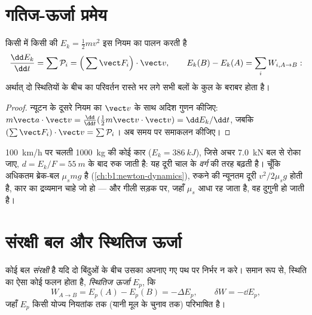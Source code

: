 \section{गतिज-ऊर्जा प्रमेय}

\begin{theorem}[गतिज-ऊर्जा और शक्ति प्रमेय]\label{thm:b1:work-and-energy:ke}
किसी  में किसी  की \emph{}
$E_k = \tfrac12 mv^2$ इस नियम का पालन करती है
\[
\frac{\dd E_k}{\dd t} = \sum\mathcal P_i = \Big(\sum\vect F_i\Big)\cdot\vect v,
\qquad
E_k(B) - E_k(A) = \sum_i W_{i,A\to B}:
\]
अर्थात् दो स्थितियों के बीच  का परिवर्तन रास्ते भर लगे सभी बलों
के कुल  के बराबर होता है।
\end{theorem}

\begin{proof}
न्यूटन के दूसरे नियम का $\vect v$ के साथ अदिश गुणन कीजिए: $m\vect a\cdot\vect v =
\tfrac{\dd}{\dd t}(\tfrac12 m\vect v\cdot\vect v) = \dd E_k/\dd t$, जबकि
$(\sum\vect F_i)\cdot\vect v = \sum\mathcal P_i$। अब समय पर समाकलन कीजिए।
\end{proof}

\begin{example}[ब्रेक-दूरी]\label{ex:b1:work-and-energy:braking}
\qty{100}{km/h} पर चलती \qty{1000}{kg} की कोई कार ($E_k = \qty{386}{kJ}$),
जिसे अचर \qty{7.0}{kN} बल से रोका जाए, $d = E_k/F = \qty{55}{m}$ के बाद
रुक जाती है: यह दूरी चाल के \emph{वर्ग} की तरह बढ़ती है। चूँकि अधिकतम
ब्रेक-बल $\mu_smg$ है (\cref{ch:b1:newton-dynamics}), रुकने की न्यूनतम दूरी
$v^2/2\mu_sg$ होती है, कार का द्रव्यमान चाहे जो हो --- और गीली सड़क पर,
जहाँ $\mu_s$ आधा रह जाता है, वह दुगुनी हो जाती है।
\end{example}

\section{संरक्षी बल और स्थितिज ऊर्जा}

\begin{definition}[संरक्षी बल; स्थितिज ऊर्जा]\label{def:b1:work-and-energy:conservative}
कोई बल \emph{संरक्षी} है यदि दो बिंदुओं के बीच उसका  अपनाए गए पथ पर
निर्भर न करे। समान रूप से, स्थिति का ऐसा कोई फलन होता है, \emph{स्थितिज
ऊर्जा} $E_p$, कि
\[
W_{A\to B} = E_p(A) - E_p(B) = -\Delta E_p ,
\qquad \delta W = -\dd E_p ,
\]
जहाँ $E_p$ किसी योज्य नियतांक तक (यानी मूल के चुनाव तक) परिभाषित है।
\end{definition}

